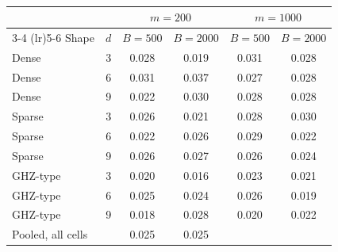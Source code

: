 \begin{table}[ht]
\centering
\caption{}
\label{tab:bsweep}
\small
\begin{tabular}{l r cc cc}
\toprule
& & \multicolumn{2}{c}{$m = 200$} & \multicolumn{2}{c}{$m = 1000$} \\
\cmidrule(lr){3-4} \cmidrule(lr){5-6}
Shape & $d$ & $B{=}500$ & $B{=}2000$ & $B{=}500$ & $B{=}2000$ \\
\midrule
Dense & 3 & 0.028 & 0.019 & 0.031 & 0.028 \\
Dense & 6 & 0.031 & 0.037 & 0.027 & 0.028 \\
Dense & 9 & 0.022 & 0.030 & 0.028 & 0.028 \\
Sparse & 3 & 0.026 & 0.021 & 0.028 & 0.030 \\
Sparse & 6 & 0.022 & 0.026 & 0.029 & 0.022 \\
Sparse & 9 & 0.026 & 0.027 & 0.026 & 0.024 \\
GHZ-type & 3 & 0.020 & 0.016 & 0.023 & 0.021 \\
GHZ-type & 6 & 0.025 & 0.024 & 0.026 & 0.019 \\
GHZ-type & 9 & 0.018 & 0.028 & 0.020 & 0.022 \\
\midrule
Pooled, all cells &  & 0.025 & 0.025 &  &  \\
\bottomrule
\end{tabular}
\end{table}
